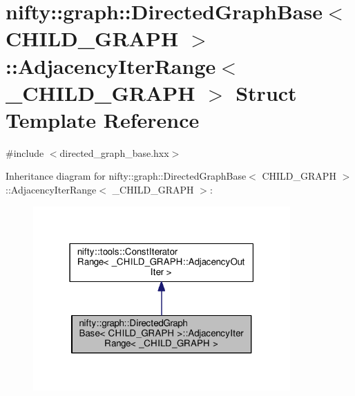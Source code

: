 \hypertarget{structnifty_1_1graph_1_1DirectedGraphBase_1_1AdjacencyIterRange}{}\section{nifty\+:\+:graph\+:\+:Directed\+Graph\+Base$<$ C\+H\+I\+L\+D\+\_\+\+G\+R\+A\+P\+H $>$\+:\+:Adjacency\+Iter\+Range$<$ \+\_\+\+C\+H\+I\+L\+D\+\_\+\+G\+R\+A\+P\+H $>$ Struct Template Reference}
\label{structnifty_1_1graph_1_1DirectedGraphBase_1_1AdjacencyIterRange}


{\ttfamily \#include $<$directed\+\_\+graph\+\_\+base.\+hxx$>$}



Inheritance diagram for nifty\+:\+:graph\+:\+:Directed\+Graph\+Base$<$ C\+H\+I\+L\+D\+\_\+\+G\+R\+A\+P\+H $>$\+:\+:Adjacency\+Iter\+Range$<$ \+\_\+\+C\+H\+I\+L\+D\+\_\+\+G\+R\+A\+P\+H $>$\+:\nopagebreak
\begin{figure}[H]
\begin{center}
\leavevmode
\includegraphics[width=279pt]{structnifty_1_1graph_1_1DirectedGraphBase_1_1AdjacencyIterRange__inherit__graph}
\end{center}
\end{figure}


